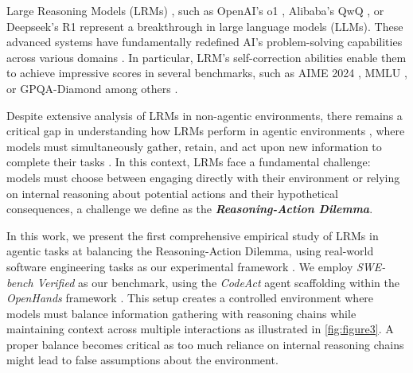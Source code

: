 Large Reasoning Models (LRMs) \cite{ guan2025rstarmathsmallllmsmaster, xu2025largereasoningmodelssurvey}, such as OpenAI’s
o1 \cite{openai_o1_system_card_2024}, Alibaba’s QwQ \cite{qwq-32b-preview}, or Deepseek's R1 \cite{deepseekai2025deepseekr1incentivizingreasoningcapability} represent a breakthrough in large language models (LLMs). These advanced systems have fundamentally redefined AI’s problem-solving capabilities across various domains \cite{besta2025reasoning}. In particular, LRM's self-correction abilities enable them to achieve impressive scores in several benchmarks, such as AIME 2024 \cite{aops_aime_2024}, MMLU \cite{hendrycks2021measuringmassivemultitasklanguage}, or GPQA-Diamond \cite{rein2023gpqagraduatelevelgoogleproofqa} among others \cite{deepseekai2025deepseekr1incentivizingreasoningcapability, openai_o1_system_card_2024, openai_o1_mini, qwq-32b-preview, guan2025rstarmathsmallllmsmaster}.

Despite extensive analysis of LRMs in non-agentic environments, there remains a critical gap in understanding how LRMs perform in agentic environments \cite{smeyatsky2024agentic}, where models must simultaneously gather, retain, and act upon new information to complete their tasks \cite{zhang2024agenticinformationretrieval,yang2024sweagentagentcomputerinterfacesenable}. In this context, LRMs face a fundamental challenge: models must choose between engaging directly with their environment or relying on internal reasoning about potential actions and their hypothetical consequences, a challenge we define as the \textbf{\textit{Reasoning-Action Dilemma}}.

In this work, we present the first comprehensive empirical study of LRMs in agentic tasks at balancing the Reasoning-Action Dilemma, using real-world software engineering tasks as our experimental framework \cite{jimenez2024swebenchlanguagemodelsresolve, yang2024sweagentagentcomputerinterfacesenable}. We employ \emph{SWE-bench Verified} \cite{jimenez2024swebenchlanguagemodelsresolve, swebench_verified} as our benchmark, using the \emph{CodeAct} agent scaffolding \cite{wang2024executablecodeactionselicit} within the \emph{OpenHands} framework \cite{wang2024openhandsopenplatformai}. This setup creates a controlled environment where models must balance information gathering with reasoning chains while maintaining context across multiple interactions as illustrated in \autoref{fig:figure3}. A proper balance becomes critical as too much reliance on internal reasoning chains might lead to false assumptions about the environment.


